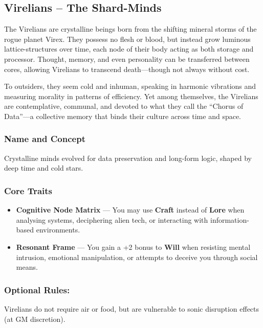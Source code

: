 \subsection*{Virelians – The Shard-Minds}

The Virelians are crystalline beings born from the shifting mineral storms of the rogue planet Virex. They possess no flesh or blood, but instead grow luminous lattice-structures over time, each node of their body acting as both storage and processor. Thought, memory, and even personality can be transferred between cores, allowing Virelians to transcend death—though not always without cost.

To outsiders, they seem cold and inhuman, speaking in harmonic vibrations and measuring morality in patterns of efficiency. Yet among themselves, the Virelians are contemplative, communal, and devoted to what they call the “Chorus of Data”—a collective memory that binds their culture across time and space.

\subsubsection{Name and Concept}

Crystalline minds evolved for data preservation and long-form logic, shaped by deep time and cold stars.

\subsubsection*{Core Traits}
\begin{itemize}
  \item \textbf{Cognitive Node Matrix} — You may use \textbf{Craft} instead of \textbf{Lore} when analysing systems, deciphering alien tech, or interacting with information-based environments.

  \item \textbf{Resonant Frame} — You gain a +2 bonus to \textbf{Will} when resisting mental intrusion, emotional manipulation, or attempts to deceive you through social means.
\end{itemize}

\subsubsection{Optional Rules:} Virelians do not require air or food, but are vulnerable to sonic disruption effects (at GM discretion).

